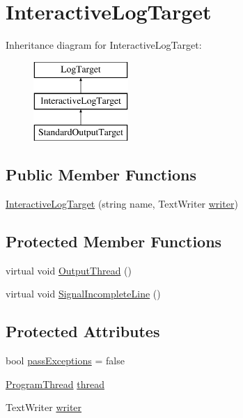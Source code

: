 \hypertarget{classOTA_1_1Logging_1_1InteractiveLogTarget}{}\section{Interactive\+Log\+Target}
\label{classOTA_1_1Logging_1_1InteractiveLogTarget}
Inheritance diagram for Interactive\+Log\+Target\+:\begin{figure}[H]
\begin{center}
\leavevmode
\includegraphics[height=3.000000cm]{classOTA_1_1Logging_1_1InteractiveLogTarget}
\end{center}
\end{figure}
\subsection*{Public Member Functions}
\begin{DoxyCompactItemize}
\item 
\hyperlink{classOTA_1_1Logging_1_1InteractiveLogTarget_a839ae37274c557a13042fd7ae1693e6e}{Interactive\+Log\+Target} (string name, Text\+Writer \hyperlink{classOTA_1_1Logging_1_1InteractiveLogTarget_a7ccedb45f8fd2e6cf4f6d7d8c095e835}{writer})
\end{DoxyCompactItemize}
\subsection*{Protected Member Functions}
\begin{DoxyCompactItemize}
\item 
virtual void \hyperlink{classOTA_1_1Logging_1_1InteractiveLogTarget_a01b86e87b2de40b0577049dc459afc35}{Output\+Thread} ()
\item 
virtual void \hyperlink{classOTA_1_1Logging_1_1InteractiveLogTarget_a25c5b3d83f91e14abf0830321a828090}{Signal\+Incomplete\+Line} ()
\end{DoxyCompactItemize}
\subsection*{Protected Attributes}
\begin{DoxyCompactItemize}
\item 
bool \hyperlink{classOTA_1_1Logging_1_1InteractiveLogTarget_a25f7d85beaa5c0f88681ca624beaae48}{pass\+Exceptions} = false
\item 
\hyperlink{classOTA_1_1Misc_1_1ProgramThread}{Program\+Thread} \hyperlink{classOTA_1_1Logging_1_1InteractiveLogTarget_ac45b98f36cdd4af53d8407dd1bd509e0}{thread}
\item 
Text\+Writer \hyperlink{classOTA_1_1Logging_1_1InteractiveLogTarget_a7ccedb45f8fd2e6cf4f6d7d8c095e835}{writer}
\end{DoxyCompactItemize}


